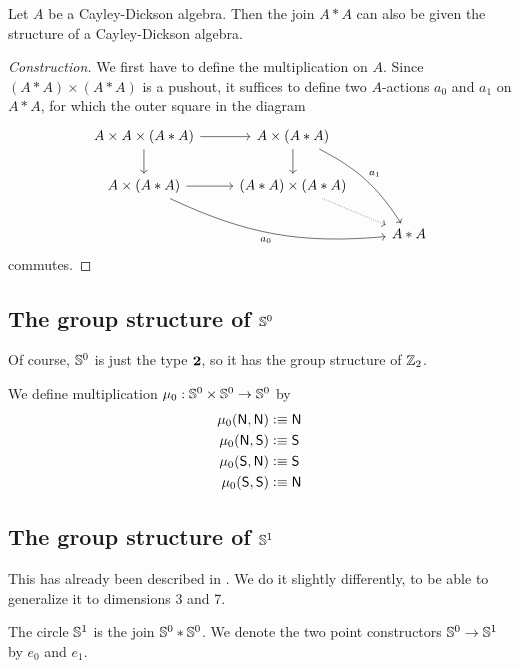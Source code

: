 \documentclass{article}
\newcommand{\join}[2]{{#1}*{#2}}
\begin{document}
\begin{defn}
Let $A$ be a Cayley-Dickson algebra. Then the join $\join{A}{A}$ can also be
given the structure of a Cayley-Dickson algebra.
\end{defn}

\begin{proof}[Construction]
We first have to define the multiplication on $A$. Since $(\join{A}{A})\times
(\join{A}{A})$ is a pushout, it suffices to define two $A$-actions $a_0$ and
$a_1$ on $\join{A}{A}$, for which the outer square in the diagram
\begin{equation*}
\begin{tikzcd}
A\times A\times(\join{A}{A}) \arrow[r] \arrow[d] & A\times(\join{A}{A}) \arrow[d] \arrow[ddr,bend left=15,"a_1"] \\
A\times(\join{A}{A}) \arrow[r] \arrow[drr,bend right=15,swap,"a_0"] & (\join{A}{A})\times(\join{A}{A}) \arrow[dr,densely dotted] \\
& & \join{A}{A}
\end{tikzcd}
\end{equation*}
commutes. 
\end{proof}

\subsection{The group structure of $\mathbb{S}^0$}

Of course, $\mathbb{S}^0$ is just the type $\mathbf{2}$, so it has the group structure of
$\mathbb{Z}_2$.

\begin{defn}
We define multiplication $\mu_0:\mathbb{S}^0\times\mathbb{S}^0\to\mathbb{S}^0$ by
\begin{align*}
\mu_0(\mathsf{N},\mathsf{N}) & \vcentcolon\equiv \mathsf{N} \\
\mu_0(\mathsf{N},\mathsf{S}) & \vcentcolon\equiv \mathsf{S} \\
\mu_0(\mathsf{S},\mathsf{N}) & \vcentcolon\equiv \mathsf{S} \\
\mu_0(\mathsf{S},\mathsf{S}) & \vcentcolon\equiv \mathsf{N}
\end{align*}
\end{defn}

\subsection{The group structure of $\mathbb{S}^1$}
This has already been described in \cite{TheBook}. We do it slightly differently,
to be able to generalize it to dimensions 3 and 7.

\begin{defn}
The circle $\mathbb{S}^1$ is the join $\join{\Sn^0}{\Sn^0}$. 
We denote the two point constructors $\mathbb{S}^0\to\mathbb{S}^1$ by $e_0$ and $e_1$. 
\end{defn}
\end{document}
